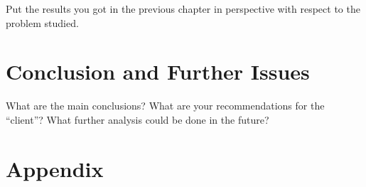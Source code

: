 \documentclass[mstat,12pt,a4paper]{unswthesis}
\begin{document}
Put the results you got in the previous chapter in perspective with
respect to the problem studied.

\chapter{Conclusion and Further
Issues}\label{conclusion-and-further-issues}

What are the main conclusions? What are your recommendations for the
``client''? What further analysis could be done in the future?




\chapter*{Appendix}\label{appendix}
\end{document}

